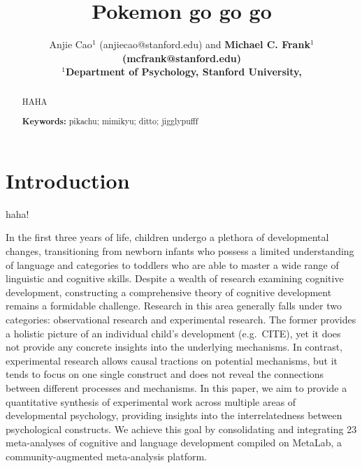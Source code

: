 \documentclass[10pt, letterpaper]{article}
\title{Pokemon go go go}
\author{Anjie Cao$^1$  (anjiecao@stanford.edu)
 and \bf{Michael C. Frank$^1$ (mcfrank@stanford.edu)} \\
$^1$Department of Psychology, Stanford University, }
\begin{document}
\maketitle

\begin{abstract}
HAHA

\textbf{Keywords:}
pikachu; mimikyu; ditto; jigglypufff
\end{abstract}

\hypertarget{introduction}{%
\section{Introduction}\label{introduction}}

haha!

In the first three years of life, children undergo a plethora of
developmental changes, transitioning from newborn infants who possess a
limited understanding of language and categories to toddlers who are
able to master a wide range of linguistic and cognitive skills. Despite
a wealth of research examining cognitive development, constructing a
comprehensive theory of cognitive development remains a formidable
challenge. Research in this area generally falls under two categories:
observational research and experimental research. The former provides a
holistic picture of an individual child's development (e.g.~CITE), yet
it does not provide any concrete insights into the underlying
mechanisms. In contrast, experimental research allows causal tractions
on potential mechanisms, but it tends to focus on one single construct
and does not reveal the connections between different processes and
mechanisms. In this paper, we aim to provide a quantitative synthesis of
experimental work across multiple areas of developmental psychology,
providing insights into the interrelatedness between psychological
constructs. We achieve this goal by consolidating and integrating 23
meta-analyses of cognitive and language development compiled on MetaLab,
a community-augmented meta-analysis platform.
\end{document}
